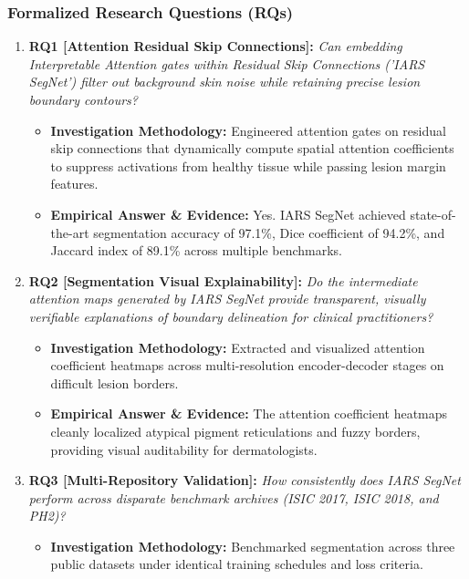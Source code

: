 \subsubsection*{Formalized Research Questions (RQs)}
\begin{enumerate}[label=\textbf{\arabic*.}, leftmargin=*]
  \item \textbf{RQ1 [Attention Residual Skip Connections]:} \textit{Can embedding Interpretable Attention gates within Residual Skip Connections ('IARS SegNet') filter out background skin noise while retaining precise lesion boundary contours?}
  \begin{itemize}[leftmargin=1.5em]
    \item \textbf{Investigation Methodology:} Engineered attention gates on residual skip connections that dynamically compute spatial attention coefficients to suppress activations from healthy tissue while passing lesion margin features.
    \item \textbf{Empirical Answer \& Evidence:} Yes. IARS SegNet achieved state-of-the-art segmentation accuracy of 97.1\%, Dice coefficient of 94.2\%, and Jaccard index of 89.1\% across multiple benchmarks.
  \end{itemize}
  \item \textbf{RQ2 [Segmentation Visual Explainability]:} \textit{Do the intermediate attention maps generated by IARS SegNet provide transparent, visually verifiable explanations of boundary delineation for clinical practitioners?}
  \begin{itemize}[leftmargin=1.5em]
    \item \textbf{Investigation Methodology:} Extracted and visualized attention coefficient heatmaps across multi-resolution encoder-decoder stages on difficult lesion borders.
    \item \textbf{Empirical Answer \& Evidence:} The attention coefficient heatmaps cleanly localized atypical pigment reticulations and fuzzy borders, providing visual auditability for dermatologists.
  \end{itemize}
  \item \textbf{RQ3 [Multi-Repository Validation]:} \textit{How consistently does IARS SegNet perform across disparate benchmark archives (ISIC 2017, ISIC 2018, and PH2)?}
  \begin{itemize}[leftmargin=1.5em]
    \item \textbf{Investigation Methodology:} Benchmarked segmentation across three public datasets under identical training schedules and loss criteria.

\end{itemize}
\end{enumerate}
